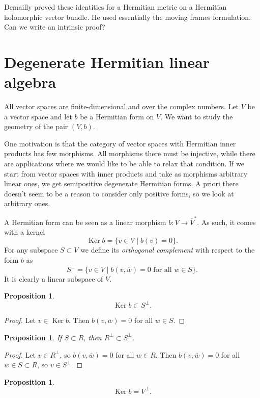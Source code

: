 \documentclass[10pt,a4paper]{article}
\newtheorem{prop}[theo]{Proposition}
\newtheorem*{proof}{Proof}
\def\ov#1{\overline{#1}}
\DeclareMathOperator{\Ker}{Ker}
\begin{document}
Demailly proved these identities for a Hermitian metric on a Hermitian holomorphic vector bundle. He used essentially the moving frames formulation. Can we write an intrinsic proof?



\section{Degenerate Hermitian linear algebra}
\label{sec:deglinalg}

All vector spaces are finite-dimensional and over the complex numbers. Let $V$ be a vector space and let $b$ be a Hermitian form on $V$. We want to study the geometry of the pair $(V,b)$.

One motivation is that the category of vector spaces with Hermitian inner products has few morphisms. All morphisms there must be injective, while there are applications where we would like to be able to relax that condition. If we start from vector spaces with inner products and take as morphisms arbitrary linear ones, we get semipositive degenerate Hermitian forms. A priori there doesn't seem to be a reason to consider only positive forms, so we look at arbitrary ones.

A Hermitian form can be seen as a linear morphism $b : V \to \ov V^*$. As such, it comes with a kernel
\[
\Ker b = \{ v \in V \mid b(v) = 0 \}.
\]
For any subspace $S \subset V$ we define its \emph{orthogonal complement} with respect to the form $b$ as
\[
S^\perp = \{ v \in V \mid b(v, \ov w) = 0 \text{ for all $w \in S$}\}.
\]
It is clearly a linear subspace of $V$.

\begin{prop}
\[
\Ker b \subset S^\perp.
\]
\end{prop}

\begin{proof}
Let $v \in \Ker b$. Then $b(v, \ov w) = 0$ for all $w \in S$.
\end{proof}


\begin{prop}
If $S \subset R$, then $R^\perp \subset S^\perp$.
\end{prop}

\begin{proof}
Let $v \in R^\perp$, so $b(v, \ov w) = 0$ for all $w \in R$. Then $b(v, \ov w) = 0$ for all $w \in S \subset R$, so $v \in S^\perp$.
\end{proof}

\begin{prop}
\[
\Ker b
= V^\perp.
\]
\end{prop}
\end{document}
